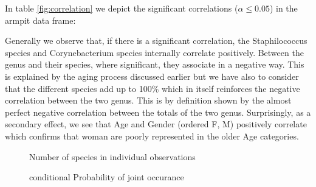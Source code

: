 In table \ref{fig:correlation}  we depict the significant correlations ($\alpha \leq 0.05$)  in the armpit data frame:  

Generally we observe that, if there is a significant correlation, the Staphilococcus species and Corynebacterium species internally correlate positively. Between the genus and their species, where significant, they associate in a negative way.
This is explained by the aging process discussed earlier but we have also to consider that the different species add up to 100\% which in itself reinforces the negative correlation between the two genus. 
This is by definition shown by the almost perfect negative correlation between the totals of the two genus.
Surprisingly, as a secondary effect, we see that Age and Gender (ordered F, M) positively correlate which confirms that woman are poorly represented in the older Age categories.


\begin{figure}
    \centering
     \resizebox{\hsize}{!}{%
        
    }
    \caption{Number of species in individual observations}
    \label{fig:nspeiciesDist}
\end{figure}

\begin{figure*}
    \centering
     \resizebox{\hsize}{!}{%
        
    }
    \caption{conditional Probability of joint occurance}
    \label{fig:conditionalPjointoccurance}
\end{figure*}